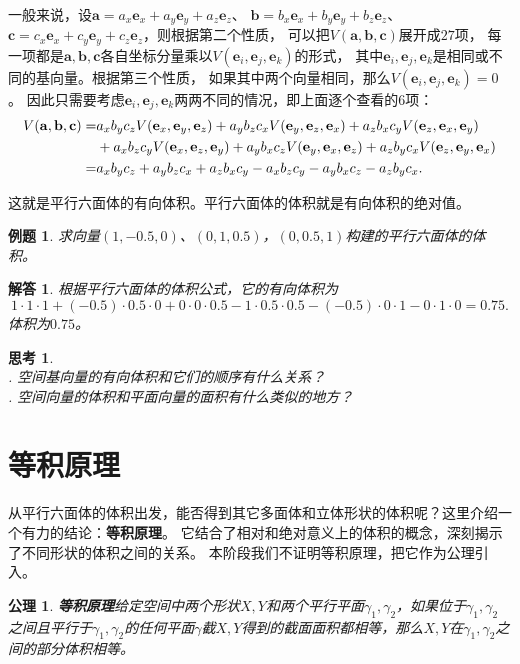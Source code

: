 \documentclass[12pt,UTF8]{ctexbook}
\newtheorem{et}{例题}[section]
\newtheorem{sk}{思考}[section]
\newtheorem{po}{公理}
\newtheorem*{so}{解答}
\begin{document}
一般来说，设$\mathbf{a} = a_x\mathbf{e}_x + a_y\mathbf{e}_y + a_z\mathbf{e}_z$、
$\mathbf{b} = b_x\mathbf{e}_x + b_y\mathbf{e}_y + b_z\mathbf{e}_z$、
$\mathbf{c} = c_x\mathbf{e}_x + c_y\mathbf{e}_y + c_z\mathbf{e}_z$，则根据第二个性质，
可以把$V(\mathbf{a},\mathbf{b},\mathbf{c})$展开成$27$项，
每一项都是$\mathbf{a},\mathbf{b},\mathbf{c}$各自坐标分量乘以$V(\mathbf{e}_i, \mathbf{e}_j, \mathbf{e}_k)$的形式，
其中$\mathbf{e}_i, \mathbf{e}_j, \mathbf{e}_k$是相同或不同的基向量。根据第三个性质，
如果其中两个向量相同，那么$V(\mathbf{e}_i, \mathbf{e}_j, \mathbf{e}_k)=0$。
因此只需要考虑$\mathbf{e}_i, \mathbf{e}_j, \mathbf{e}_k$两两不同的情况，即上面逐个查看的$6$项：
\begin{align}
    V(\mathbf{a},\mathbf{b},\mathbf{c}) = & a_xb_yc_zV(\mathbf{e}_x, \mathbf{e}_y, \mathbf{e}_z) + a_yb_zc_xV(\mathbf{e}_y, \mathbf{e}_z, \mathbf{e}_x) + a_zb_xc_yV(\mathbf{e}_z, \mathbf{e}_x, \mathbf{e}_y) \notag\\ 
    &+ a_xb_zc_yV(\mathbf{e}_x, \mathbf{e}_z, \mathbf{e}_y) + a_yb_xc_zV(\mathbf{e}_y, \mathbf{e}_x, \mathbf{e}_z) + a_zb_yc_xV(\mathbf{e}_z, \mathbf{e}_y, \mathbf{e}_x) \notag\\
    = & a_xb_yc_z + a_yb_zc_x + a_zb_xc_y - a_xb_zc_y - a_yb_xc_z - a_zb_yc_x. \notag
\end{align}

这就是平行六面体的有向体积。平行六面体的体积就是有向体积的绝对值。
\begin{et}
    求向量$(1,-0.5,0)$、$(0,1,0.5)$，$(0,0.5,1)$构建的平行六面体的体积。
\end{et}
\begin{so}
    根据平行六面体的体积公式，它的有向体积为
    $$ 1\cdot 1\cdot 1 + (-0.5)\cdot 0.5\cdot 0 + 0\cdot 0\cdot 0.5 - 1\cdot 0.5\cdot 0.5 - (-0.5)\cdot 0\cdot 1 - 0\cdot 1\cdot 0 = 0.75.$$
    体积为$0.75$。
\end{so}

\begin{sk}
    \mbox{} \\
    . 空间基向量的有向体积和它们的顺序有什么关系？  \\
    . 空间向量的体积和平面向量的面积有什么类似的地方？
\end{sk}

\section{等积原理}

从平行六面体的体积出发，能否得到其它多面体和立体形状的体积呢？这里介绍一个有力的结论：\textbf{等积原理}。
它结合了相对和绝对意义上的体积的概念，深刻揭示了不同形状的体积之间的关系。
本阶段我们不证明等积原理，把它作为公理引入。
\begin{po}{\textbf{等积原理}}\label{po:6}
    给定空间中两个形状$X,Y$和两个平行平面$\gamma_1,\gamma_2$，如果位于$\gamma_1,\gamma_2$之间且平行于$\gamma_1,\gamma_2$的任何平面$\gamma$截$X,Y$得到的截面面积都相等，那么$X,Y$在$\gamma_1,\gamma_2$之间的部分体积相等。
\end{po}
\end{document}
